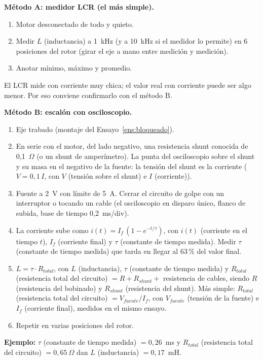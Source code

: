 \documentclass[11pt,a4paper]{article}
\begin{document}
\textbf{Método A: medidor LCR (el más simple).}
\begin{enumerate}
\item Motor desconectado de todo y quieto.
\item Medir $L$ (inductancia) a 1~kHz (y a 10~kHz si el medidor lo permite) en 6 posiciones del rotor (girar el eje a mano entre medición y medición).
\item Anotar mínimo, máximo y promedio.
\end{enumerate}
El LCR mide con corriente muy chica; el valor real con corriente puede ser algo menor. Por eso conviene confirmarlo con el método B.

\textbf{Método B: escalón con osciloscopio.}
\begin{enumerate}
\item Eje trabado (montaje del Ensayo~\ref{ens:bloqueado}).
\item En serie con el motor, del lado negativo, una resistencia shunt conocida de 0,1~$\Omega$ (o un shunt de amperímetro). La punta del osciloscopio sobre el shunt y su masa en el negativo de la fuente: la tensión del shunt es la corriente ($V = 0{,}1\,I$, con $V$ (tensión sobre el shunt) e $I$ (corriente)).
\item Fuente a 2~V con límite de 5~A. Cerrar el circuito de golpe con un interruptor o tocando un cable (el osciloscopio en disparo único, flanco de subida, base de tiempo 0,2~ms/div).
\item La corriente sube como $i(t) = I_f\,(1 - e^{-t/\tau})$, con $i(t)$ (corriente en el tiempo $t$), $I_f$ (corriente final) y $\tau$ (constante de tiempo medida). Medir $\tau$ (constante de tiempo medida) que tarda en llegar al 63\,\% del valor final.
\item $L = \tau \cdot R_{total}$, con $L$ (inductancia), $\tau$ (constante de tiempo medida) y $R_{total}$ (resistencia total del circuito) $= R + R_{shunt} + $ resistencia de cables, siendo $R$ (resistencia del bobinado) y $R_{shunt}$ (resistencia del shunt). Más simple: $R_{total}$ (resistencia total del circuito) $= V_{fuente}/I_f$, con $V_{fuente}$ (tensión de la fuente) e $I_f$ (corriente final), medidos en el mismo ensayo.
\item Repetir en varias posiciones del rotor.
\end{enumerate}

\textbf{Ejemplo:} $\tau$ (constante de tiempo medida) $= 0{,}26$~ms y $R_{total}$ (resistencia total del circuito) $= 0{,}65~\Omega$ dan $L$ (inductancia) $= 0{,}17$~mH.
\end{document}
